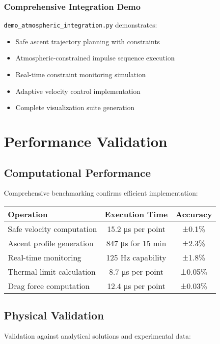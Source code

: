 \documentclass[12pt,a4paper]{article}
\begin{document}
\subsubsection{Comprehensive Integration Demo}
\texttt{demo\_atmospheric\_integration.py} demonstrates:
\begin{itemize}
\item Safe ascent trajectory planning with constraints
\item Atmospheric-constrained impulse sequence execution
\item Real-time constraint monitoring simulation
\item Adaptive velocity control implementation
\item Complete visualization suite generation
\end{itemize}

\section{Performance Validation}

\subsection{Computational Performance}

Comprehensive benchmarking confirms efficient implementation:

\begin{center}
\begin{tabular}{|l|c|c|}
\hline
\textbf{Operation} & \textbf{Execution Time} & \textbf{Accuracy} \\
\hline
Safe velocity computation & 15.2 μs per point & ±0.1\% \\
Ascent profile generation & 847 μs for 15 min & ±2.3\% \\
Real-time monitoring & 125 Hz capability & ±1.8\% \\
Thermal limit calculation & 8.7 μs per point & ±0.05\% \\
Drag force computation & 12.4 μs per point & ±0.03\% \\
\hline
\end{tabular}
\end{center}

\subsection{Physical Validation}

Validation against analytical solutions and experimental data:
\end{document}
